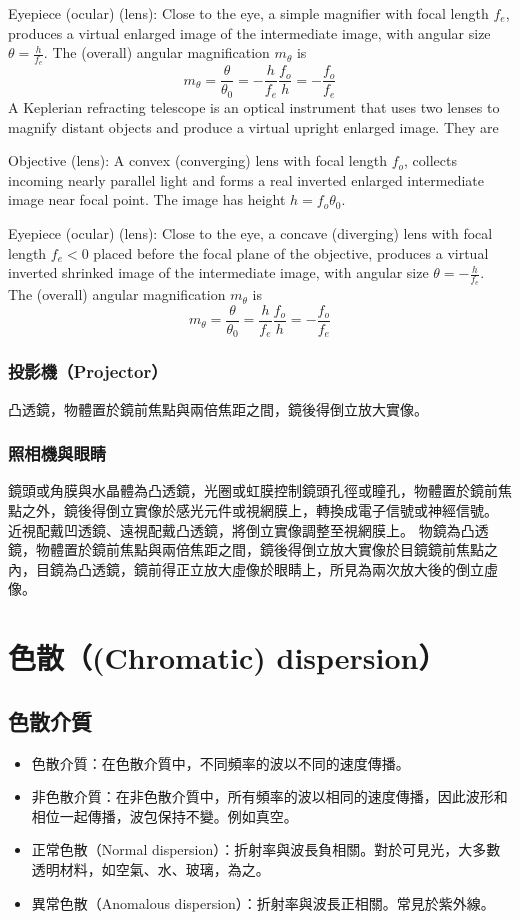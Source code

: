 \documentclass[a4paper,12pt]{report}
\begin{document}
\item Eyepiece (ocular) (lens): Close to the eye, a simple magnifier with focal length $f_e$, produces a virtual enlarged image of the intermediate image, with angular size $\theta=\frac{h}{f_e}$.
\eit
The (overall) angular magnification $m_{\theta}$ is
\[m_{\theta}=\frac{\theta}{\theta_0}=-\frac{h}{f_e}\frac{f_o}{h}=-\frac{f_o}{f_e}\]
A Keplerian refracting telescope is an optical instrument that uses two lenses to magnify distant objects and produce a virtual upright enlarged image. They are
\bit
\item Objective (lens): A convex (converging) lens with focal length $f_o$, collects incoming nearly parallel light and forms a real inverted enlarged intermediate image near focal point. The image has height $h=f_o\theta_0$.
\item Eyepiece (ocular) (lens): Close to the eye, a concave (diverging) lens with focal length $f_e<0$ placed before the focal plane of the objective, produces a virtual inverted shrinked image of the intermediate image, with angular size $\theta=-\frac{h}{f_e}$.
\eit
The (overall) angular magnification $m_{\theta}$ is
\[m_{\theta}=\frac{\theta}{\theta_0}=\frac{h}{f_e}\frac{f_o}{h}=-\frac{f_o}{f_e}\]
\subsubsection{投影機（Projector）}
凸透鏡，物體置於鏡前焦點與兩倍焦距之間，鏡後得倒立放大實像。
\subsubsection{照相機與眼睛}
鏡頭或角膜與水晶體為凸透鏡，光圈或虹膜控制鏡頭孔徑或瞳孔，物體置於鏡前焦點之外，鏡後得倒立實像於感光元件或視網膜上，轉換成電子信號或神經信號。
近視配戴凹透鏡、遠視配戴凸透鏡，將倒立實像調整至視網膜上。
物鏡為凸透鏡，物體置於鏡前焦點與兩倍焦距之間，鏡後得倒立放大實像於目鏡鏡前焦點之內，目鏡為凸透鏡，鏡前得正立放大虛像於眼睛上，所見為兩次放大後的倒立虛像。


\section{色散（(Chromatic) dispersion）}
\subsection{色散介質}
\begin{itemize}
\item 色散介質：在色散介質中，不同頻率的波以不同的速度傳播。
\item 非色散介質：在非色散介質中，所有頻率的波以相同的速度傳播，因此波形和相位一起傳播，波包保持不變。例如真空。
\item 正常色散（Normal dispersion）：折射率與波長負相關。對於可見光，大多數透明材料，如空氣、水、玻璃，為之。
\item 異常色散（Anomalous dispersion）：折射率與波長正相關。常見於紫外線。
\end{itemize}
\end{document}
